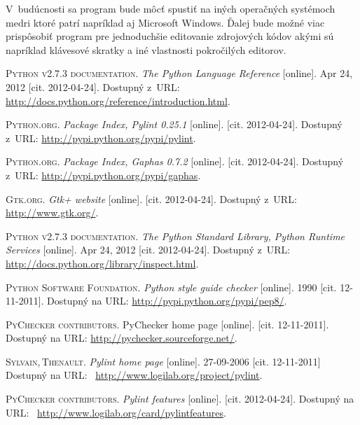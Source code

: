 \documentclass[11pt,oneside,final]{fithesis2}
\begin{document}
	V~budúcnosti sa program bude môcť spustiť na iných operačných systémoch medri ktoré patrí napríklad aj Microsoft Windows. Ďalej bude možné viac prispôsobiť program pre jednoduchšie editovanie zdrojových kódov akými sú napríklad klávesové skratky a iné vlastnosti pokročilých editorov.
	
	
\begin{thebibliography}{99}

		\textsc{Python v2.7.3 documentation}.
		\textit{The Python Language Reference} [online].
		Apr 24, 2012 [cit. \mbox{2012-04-24}].
		Dostupný z~URL:
		\url{http://docs.python.org/reference/introduction.html}.
		
		
		\textsc{Python.org}.
		\textit{Package Index, Pylint 0.25.1} [online].
		[cit. \mbox{2012-04-24}].
		Dostupný z~URL:
		\url{http://pypi.python.org/pypi/pylint}.

		\textsc{Python.org}.
		\textit{Package Index, Gaphas 0.7.2} [online].
		[cit. \mbox{2012-04-24}].
		Dostupný z~URL:
		\url{http://pypi.python.org/pypi/gaphas}.

		\textsc{Gtk.org}.
		\textit{Gtk+ website} [online].
		[cit. \mbox{2012-04-24}].
		Dostupný z~URL:
		\url{http://www.gtk.org/}.
		
		\textsc{Python v2.7.3 documentation}.
		\textit{The Python Standard Library, Python Runtime Services} [online].
		Apr 24, 2012 [cit. \mbox{2012-04-24}].
		Dostupný z~URL:
		\url{http://docs.python.org/library/inspect.html}.
		
    \textsc{Python Software Foundation}.
    \textit{Python style guide checker} [online]. 1990 [cit. 12-11-2011].
    Dostupný na URL:
    \url{http://pypi.python.org/pypi/pep8/}.
    
    \textsc{PyChecker contributors}.
    {PyChecker home page} [online].
    [cit. 12-11-2011].
    Dostupný na URL:
    \url{http://pychecker.sourceforge.net/}.
    
    \textsc{Sylvain,\,Thenault}.
    \textit{Pylint home page} [online].
    27-09-2006
    [cit. 12-11-2011]
    Dostupný na URL:~
    \url{http://www.logilab.org/project/pylint}.
    
    \textsc{PyChecker contributors}.
    \textit{Pylint features} [online].
    [cit. \mbox{2012-04-24}].
    Dostupný na URL:~
    \url{http://www.logilab.org/card/pylintfeatures}.


\end{thebibliography}
\end{document}
